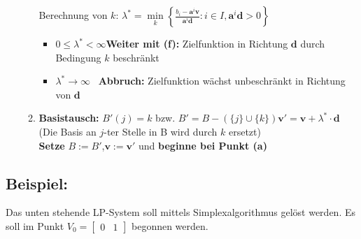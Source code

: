 \begin{enumerate}
\begin{enumerate}
	Berechnung von $k$: $\lambda^* = \min\limits_k \left\{ \frac{b_i-\mathbf{a}^i\mathbf{v}}{\mathbf{a}^i\mathbf{d}}: i \in I, \mathbf{a}^i\mathbf{d} > 0\right\}$
		
	\begin{itemize}
		\item $0\leq\lambda^*<\infty$\qquad \textbf{Weiter mit (f):} Zielfunktion in Richtung $\mathbf{d}$ durch Bedingung $k$ beschränkt
		\item $\lambda^*\rightarrow\infty$\qquad\quad~ \textbf{Abbruch:} Zielfunktion wächst unbeschränkt in Richtung von $\mathbf{d}$
	\end{itemize}
	\item \textbf{Basistausch:} $B'(j)=k$ bzw. $B' = B - (\{j\} \cup \{k\})$\qquad $\boxed{\mathbf{v'}=\mathbf{v}+\lambda^*\cdot \mathbf{d}}$\quad (Die Basis an $j$-ter Stelle in B wird durch $k$ ersetzt)\\
	
	\textbf{Setze} $\boxed{B:=B'}$,\quad $\boxed{\mathbf{v}:=\mathbf{v'}}$ und \textbf{beginne bei Punkt (a)}
	\end{enumerate}
\end{enumerate}

\subsection{Beispiel:}
Das unten stehende LP-System soll mittels Simplexalgorithmus gelöst werden. Es soll im Punkt $V_0=\begin{bmatrix}0 & 1\end{bmatrix}$ begonnen werden.\\

